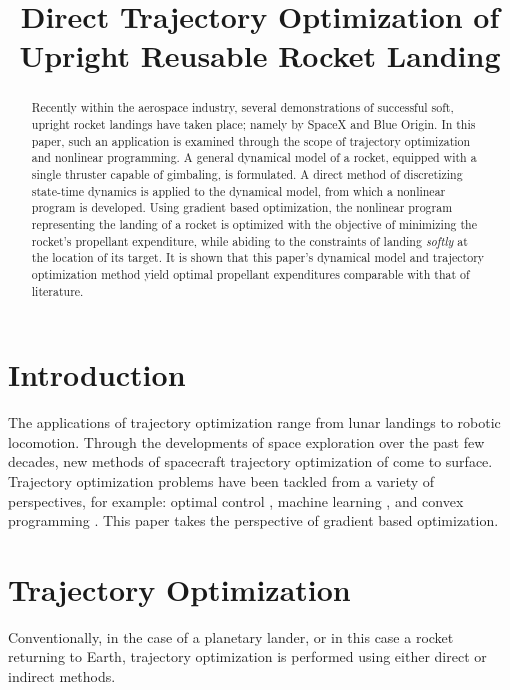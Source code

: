 \documentclass{article}
\title{Direct Trajectory Optimization of Upright Reusable Rocket Landing}
\begin{document}
\maketitle

\begin{abstract}
    Recently within the aerospace industry, several demonstrations of successful soft, upright rocket landings have taken place; namely by SpaceX and Blue Origin. In this paper, such an application is examined through the scope of trajectory optimization and nonlinear programming. A general dynamical model of a rocket, equipped with a single thruster capable of gimbaling, is formulated. A direct method of discretizing state-time dynamics is applied to the dynamical model, from which a nonlinear program is developed. Using gradient based optimization, the nonlinear program representing the landing of a rocket is optimized with the objective of minimizing the rocket's propellant expenditure, while abiding to the constraints of landing \textit{softly} at the location of its target. It is shown that this paper's dynamical model and trajectory optimization method yield optimal propellant expenditures comparable with that of literature.
\end{abstract}
    

\tableofcontents
\listoftables
\listoffigures
\lstlistoflistings


\section{Introduction}
The applications of trajectory optimization range from lunar landings to robotic locomotion. Through the developments of space exploration over the past few decades, new methods of spacecraft trajectory optimization of come to surface. Trajectory optimization problems have been tackled from a variety of perspectives, for example: optimal control \cite{Zhou2012}, machine learning \cite{DBLP:journals/corr/Sanchez-Sanchez16}, and convex programming \cite{Acikmese2007}. This paper takes the perspective of gradient based optimization.

\section{Trajectory Optimization}
Conventionally, in the case of a planetary lander, or in this case a rocket returning to Earth, trajectory optimization is performed using either direct or indirect methods. 
\end{document}

